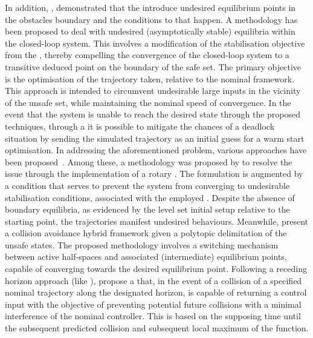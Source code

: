 In addition, \cite{reis2020control}, demonstrated that the  \cite{ames2019control} introduce undesired equilibrium points in the obstacles boundary and the conditions to that happen. A methodology has been proposed to deal with undesired (asymptotically stable) equilibria within the closed-loop system. This involves a modification of the stabilisation objective from the , thereby compelling the convergence of the closed-loop system to a transitive deduced point on the boundary of the safe set. The primary objective is the optimisation of the trajectory taken, relative to the nominal  framework. This approach is intended to circumvent undesirable large inputs in the vicinity of the unsafe set, while maintaining the nominal speed of convergence. In the event that the system is unable to reach the desired state through the proposed techniques, through a  it is possible to mitigate the chances of a deadlock situation by sending the simulated trajectory as an initial guess for a warm start optimisation. 
In addressing the aforementioned problem, various approaches have been proposed~\cite{braun2020comment, cortez2022compatibility}. Among these, a methodology was proposed by \cite{reis2020control} to resolve the issue through the implementation of a rotary . The  formulation is augmented by a  condition that serves to prevent the system from converging to undesirable stabilisation conditions, associated with the employed . Despite the absence of boundary equilibria, as evidenced by the  level set initial setup relative to the starting point, the trajectories manifest undesired behaviours. 
Meanwhile, \cite{matias2025hybrid} present a collision avoidance hybrid  framework given a polytopic delimitation of the unsafe states. The proposed methodology involves a switching mechanism between active half-spaces and associated (intermediate) equilibrium points, capable of converging towards the desired equilibrium point. 
Following a receding horizon approach (like ), \cite{breeden2022predictive}  propose a  that, in the event of a collision of a specified nominal trajectory along the designated horizon, is capable of returning a control input with the objective of preventing potential future collisions with a minimal interference of the nominal controller. This is based on the supposing time until the subsequent predicted collision and subsequent local maximum of the  function.  



